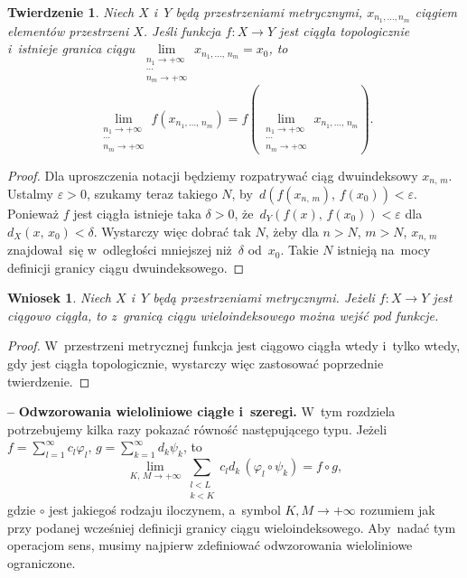 \documentclass[a4paper,11pt]{article}
\newtheorem{twr}{Twierdzenie}
\newtheorem{wni}{Wniosek}%
\newcommand{\ld}{\ldots}
\newcommand{\ra}{\rightarrow}
\newcommand{\wtw}{wtedy i~tylko wtedy}
\newcommand{\del}{\delta}
\newcommand{\veps}{\varepsilon}
\newcommand{\vp}{\varphi}
\newcommand{\Lim}{\lim\limits}
\newcommand{\Sum}{\sum\limits}
\newcommand{\tb}{\textbf}
\newcommand{\noi}{\noindent}
\newcommand{\start}{\noi \tb{--} {}}
\newcommand{\ci}{\circ}
\begin{document}
\begin{twr}
  Niech $X$ i~$Y$ będą przestrzeniami metrycznymi,
  $x_{ n_{ 1 }, \ld, n_{ m } }$ ciągiem elementów przestrzeni $X$.
  Jeśli funkcja $f: X \ra Y$ jest ciągła topologicznie i~istnieje
  granica ciągu
  $\Lim_{ \substack{ n_{ 1 } \ra +\infty \\ \cdots \\ n_{ m } \ra
      +\infty } } x_{ n_{ 1 }, \ld, \, n_{ m } } = x_{ 0 }$, to
  \begin{equation}
    \Lim_{ \substack{ n_{ 1 } \ra +\infty \\ \cdots \\  n_{ m } \ra +\infty } }
    f( x_{ n_{ 1 }, \ld, \, n_{ m } } )
    = f( \Lim_{ \substack{ n_{ 1 } \ra +\infty \\ \cdots \\ n_{ m } \ra
        +\infty } } x_{ n_{ 1 }, \ld, \, n_{ m } } ).
  \end{equation}
\end{twr}

\begin{proof}
  Dla uproszczenia notacji będziemy rozpatrywać ciąg dwuindeksowy
  $x_{ n, \, m }$. Ustalmy $\veps > 0$, szukamy teraz takiego $N$,
  by~$d( f( x_{ n, \, m } ),\, f( x_{ 0 } ) ) < \veps$. Ponieważ $f$
  jest ciągła istnieje taka $\del > 0$, \linebreak
  że~$d_{ Y }( f( x ),\, f( x_{ 0 } ) ) < \veps$
  dla~$d_{ X }( x,\, x_{ 0 } ) < \del$. Wystarczy więc dobrać tak $N$,
  żeby dla $n > N$, $m > N$, $x_{ n, \, m }$ znajdował~się
  w~odległości mniejszej niż~$\del$ od~$x_{ 0 }$. Takie $N$ istnieją
  na~mocy definicji granicy ciągu dwuindeksowego.
\end{proof}

\begin{wni}
  Niech $X$ i~$Y$ będą przestrzeniami metrycznymi. Jeżeli $f: X \ra Y$
  jest ciągowo ciągła, to z~granicą ciągu wieloindeksowego można wejść
  pod funkcje.
\end{wni}

\begin{proof}
  W~przestrzeni metrycznej funkcja jest ciągowo ciągła \wtw, gdy jest
  ciągła topologicznie, wystarczy więc zastosować poprzednie
  twierdzenie.
\end{proof}

\start \tb{Odwzorowania wieloliniowe ciągłe i~szeregi.} W~tym
rozdziela %
potrzebujemy kilka razy pokazać równość następującego typu. Jeżeli
$f = \sum_{ l = 1 }^{ \infty } c_{ l } \vp_{ l }$,
$g = \sum_{ k = 1 }^{ \infty } d_{ k } \psi_{ k }$, to
\begin{equation*}
  \Lim_{ K,\, M \ra +\infty } \Sum_{ \substack{ l < L \\ k < K } }
  c_{ l } d_{ k } \, (\vp_{ l } \ci \psi_{ k } ) = f \ci g,
\end{equation*}
gdzie $\ci$ jest jakiegoś rodzaju iloczynem, a~symbol
$K, M \ra +\infty$ rozumiem jak przy podanej wcześniej definicji
granicy ciągu wieloindeksowego. Aby~nadać tym operacjom sens, musimy
najpierw zdefiniować odwzorowania wieloliniowe ograniczone.
\end{document}
